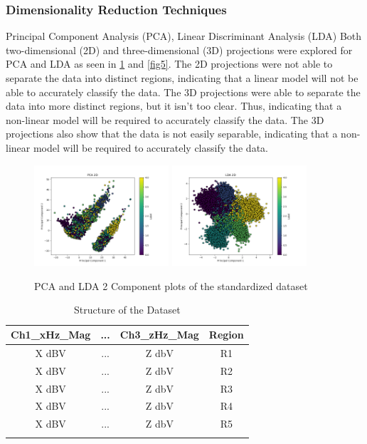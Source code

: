 \documentclass[conference]{IEEEtran}
\begin{document}
\subsubsection{Dimensionality Reduction Techniques}
Principal Component Analysis (PCA), Linear Discriminant Analysis (LDA) Both two-dimensional (2D) and three-dimensional (3D) projections were explored for PCA and LDA as seen in \ref{fig4} and \ref{fig5}. The 2D projections were not able to separate the data into distinct regions, indicating that a linear model will not be able to accurately classify the data. The 3D projections were able to separate the data into more distinct regions, but it isn't too clear. Thus, indicating that a non-linear model will be required to accurately classify the data. The 3D projections also show that the data is not easily separable, indicating that a non-linear model will be required to accurately classify the data.
\begin{figure}[htbp]
    \centering
    \includegraphics[width=5cm]{figs/nn/pca_2d.png} %
    \includegraphics[width=5cm]{figs/nn/lda_2d.png} %
    \caption{PCA and LDA 2 Component plots of the standardized dataset}
    \label{fig4}
\end{figure}

\begin{table}[bp]
    \centering
    \begin{tabular}{cccc}
        \toprule
        \textbf{Ch1\_xHz\_Mag} & \textbf{...} & \textbf{Ch3\_zHz\_Mag} & \textbf{Region} \\
        \midrule
        X dBV & ... & Z dbV & R1 \\
        X dBV & ... & Z dbV & R2 \\
        X dBV & ... & Z dbV & R3 \\
        X dBV & ... & Z dbV & R4 \\
        X dBV & ... & Z dbV & R5 \\
        \bottomrule\\
    \end{tabular}
    \caption{Structure of the Dataset}
    \label{tab:dataset_structure}
\end{table}
\end{document}
